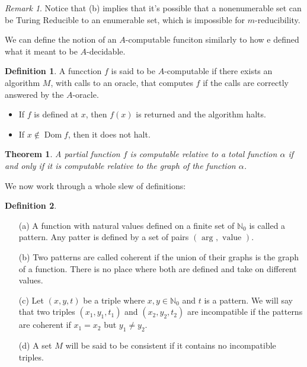 \documentclass[10pt, letterpaper]{article}
\newcommand{\N}{\mathbb{N}}
\newtheorem{thm}{Theorem}
\theoremstyle{remark}
\newtheorem{rem}{Remark}
\theoremstyle{definition}
\newtheorem{defn}{Definition}
\begin{document}
    \begin{rem}
        Notice that (b) implies that it's possible that a nonenumerable set can be Turing Reducible to an enumerable set, which is 
        impossible for $m$-reducibility.
    \end{rem}

    We can define the notion of an $A$-computable funciton similarly to how e defined what it meant to be $A$-decidable.

    \begin{defn}
        A funcction $f$ is said to be $A$-computable if there exists an algorithm $M$, with calls to an oracle, that computes $f$ if the calls are correctly 
        answered by the $A$-oracle.
    \end{defn}

    \begin{itemize}
        \item If $f$ is defined at $x$, then $f(x)$ is returned and the algorithm halts.
        \item If $x \notin \operatorname{Dom} f$, then it does not halt.
    \end{itemize}

    \begin{thm}
        A partial function $f$ is computable relative to a total function $\alpha$ if and only if it is computable relative to the graph of the 
        function $\alpha$.
    \end{thm}

    We now work through a whole slew of definitions:

    \begin{defn} \leavevmode
        \begin{enumerate}
            \item [(a)] A function with natural values defined on a finite set of $\N_0$ is called a pattern. Any patter is defined by a set of 
            pairs $(\text{ arg }, \text{ value })$.
            \item [(b)] Two patterns are called coherent if the union of their graphs is the graph of a function. There is no place where both are 
            defined and take on different values.
            \item [(c)] Let $(x,y,t)$ be a triple where $x,y \in \N_0$ and $t$ is a pattern. We will say that two triples $(x_1, y_1, t_1)$ and $(x_2, y_2, t_2)$ are 
            incompatible if the patterns are coherent if $x_1=x_2$ but $y_1 \neq y_2$.
            \item [(d)] A set $M$ will be said to be consistent if it contains no incompatible triples.
        \end{enumerate}
    \end{defn}
\end{document}
